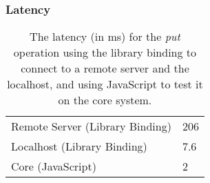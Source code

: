 \begin{frame}[fragile]
\frametitle{Latency}
\begin{table}
  \begin{tabular}{l | l}
    Remote Server (Library Binding) & 206 \\
    Localhost (Library Binding) & 7.6 \\
    Core (JavaScript) & 2
  \end{tabular}    	
  \caption{The latency (in ms) for the \emph{put} operation using the library binding to connect to a remote server and the localhost, and using JavaScript to test it on the core system.}
  \label{table:latency}
\end{table}
\end{frame}